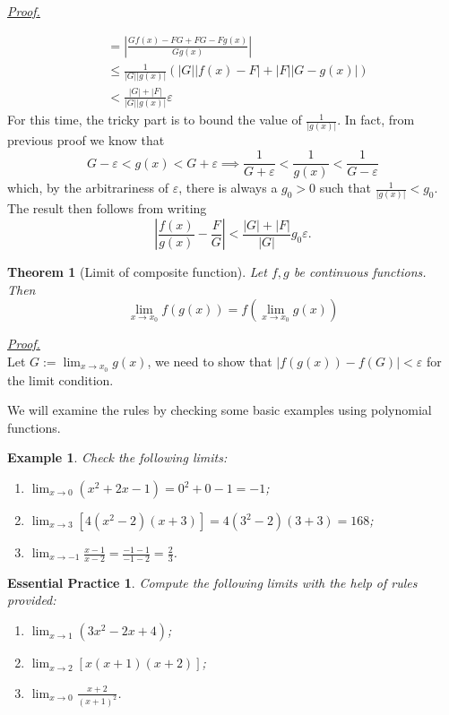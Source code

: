 \documentclass[12pt]{article}
\newtheorem*{theorem}{Theorem}
\newtheorem*{example}{Example}
\newtheorem{exercise}{Essential Practice}[section]
\renewenvironment{proof}[1][Proof]{\begin{snugshade*} \underline{\textit{{#1}.}}\\}{\hfill \qedsymbol \end{snugshade*}}
\begin{document}
\begin{proof}
\begin{enumerate}
\begin{align*}
                &=|\frac{Gf(x)-FG+FG-Fg(x)}{Gg(x)}|\\
                &\leq \frac{1}{|G||g(x)|}(|G||f(x)-F|+|F||G-g(x)|)\\
                &<\frac{|G|+|F|}{|G||g(x)|}\varepsilon
            \end{align*}
            For this time, the tricky part is to bound the value of $\frac{1}{|g(x)|}$. In fact, from previous proof we know that \[G-\varepsilon<g(x)<G+\varepsilon \implies \frac{1}{G+\varepsilon}<\frac{1}{g(x)}<\frac{1}{G-\varepsilon}\] which, by the arbitrariness of $\varepsilon$, there is always a $g_0>0$ such that $\frac{1}{|g(x)|}<g_0$. The result then follows from writing \[|\frac{f(x)}{g(x)}-\frac{F}{G}|<\frac{|G|+|F|}{|G|}g_0\varepsilon.\]
        \end{enumerate}
    \end{proof}

    \begin{theorem}[Limit of composite function]
        Let $f,g$ be continuous functions. Then \[\lim_{x\to x_0}f(g(x))=f(\lim_{x\to x_0}g(x))\]
    \end{theorem}

    \begin{proof}
        Let $G:=\displaystyle\lim_{x\to x_0}g(x)$, we need to show that $|f(g(x))-f(G)|<\varepsilon$ for the limit condition.
    \end{proof}

    We will examine the rules by checking some basic examples using polynomial functions.

    \begin{example}
        Check the following limits:\begin{enumerate}
            \item $\displaystyle\lim_{x\to 0}(x^2+2x-1)=0^2+0-1=-1$;
            \item $\displaystyle\lim_{x\to 3}[4(x^2-2)(x+3)]=4(3^2-2)(3+3)=168$;
            \item $\displaystyle\lim_{x\to -1}\frac{x-1}{x-2}=\frac{-1-1}{-1-2}=\frac{2}{3}$.
        \end{enumerate}
    \end{example}

    \begin{exercise}
        Compute the following limits with the help of rules provided:\begin{enumerate}
            \item $\displaystyle\lim_{x\to 1}(3x^2-2x+4)$;
            \item $\displaystyle\lim_{x\to 2}[x(x+1)(x+2)]$;
            \item $\displaystyle\lim_{x\to 0}\frac{x+2}{(x+1)^2}$.
        \end{enumerate}
    \end{exercise}
\end{document}
